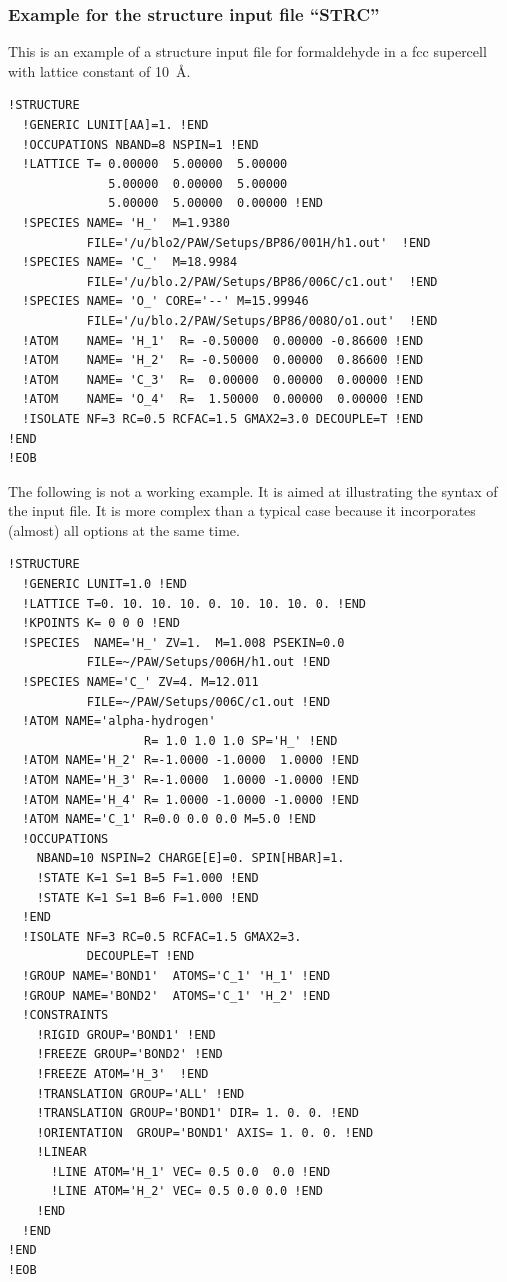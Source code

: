 \documentclass[final,12pt,makeidx,DIV=calc]{article}
\begin{document}
\subsubsection{Example for the structure input file ``STRC''}
This is an example of a structure input file for formaldehyde in a fcc
supercell with lattice constant of 10~\AA.
\begin{verbatim}
!STRUCTURE
  !GENERIC LUNIT[AA]=1. !END   
  !OCCUPATIONS NBAND=8 NSPIN=1 !END
  !LATTICE T= 0.00000  5.00000  5.00000               
              5.00000  0.00000  5.00000               
              5.00000  5.00000  0.00000 !END
  !SPECIES NAME= 'H_'  M=1.9380 
           FILE='/u/blo2/PAW/Setups/BP86/001H/h1.out'  !END 
  !SPECIES NAME= 'C_'  M=18.9984 
           FILE='/u/blo.2/PAW/Setups/BP86/006C/c1.out'  !END 
  !SPECIES NAME= 'O_' CORE='--' M=15.99946 
           FILE='/u/blo.2/PAW/Setups/BP86/008O/o1.out'  !END 
  !ATOM    NAME= 'H_1'  R= -0.50000  0.00000 -0.86600 !END
  !ATOM    NAME= 'H_2'  R= -0.50000  0.00000  0.86600 !END
  !ATOM    NAME= 'C_3'  R=  0.00000  0.00000  0.00000 !END
  !ATOM    NAME= 'O_4'  R=  1.50000  0.00000  0.00000 !END
  !ISOLATE NF=3 RC=0.5 RCFAC=1.5 GMAX2=3.0 DECOUPLE=T !END 
!END 
!EOB 
\end{verbatim}
The following is not a working example. It is aimed at illustrating
the syntax of the input file. It is more complex than a typical case
because it incorporates (almost) all options at the same time.
\begin{verbatim}
!STRUCTURE 
  !GENERIC LUNIT=1.0 !END 
  !LATTICE T=0. 10. 10. 10. 0. 10. 10. 10. 0. !END 
  !KPOINTS K= 0 0 0 !END 
  !SPECIES  NAME='H_' ZV=1.  M=1.008 PSEKIN=0.0
           FILE=~/PAW/Setups/006H/h1.out !END 
  !SPECIES NAME='C_' ZV=4. M=12.011 
           FILE=~/PAW/Setups/006C/c1.out !END 
  !ATOM NAME='alpha-hydrogen' 
                   R= 1.0 1.0 1.0 SP='H_' !END 
  !ATOM NAME='H_2' R=-1.0000 -1.0000  1.0000 !END 
  !ATOM NAME='H_3' R=-1.0000  1.0000 -1.0000 !END 
  !ATOM NAME='H_4' R= 1.0000 -1.0000 -1.0000 !END 
  !ATOM NAME='C_1' R=0.0 0.0 0.0 M=5.0 !END
  !OCCUPATIONS 
    NBAND=10 NSPIN=2 CHARGE[E]=0. SPIN[HBAR]=1. 
    !STATE K=1 S=1 B=5 F=1.000 !END 
    !STATE K=1 S=1 B=6 F=1.000 !END 
  !END
  !ISOLATE NF=3 RC=0.5 RCFAC=1.5 GMAX2=3. 
           DECOUPLE=T !END 
  !GROUP NAME='BOND1'  ATOMS='C_1' 'H_1' !END 
  !GROUP NAME='BOND2'  ATOMS='C_1' 'H_2' !END 
  !CONSTRAINTS
    !RIGID GROUP='BOND1' !END 
    !FREEZE GROUP='BOND2' !END 
    !FREEZE ATOM='H_3'  !END 
    !TRANSLATION GROUP='ALL' !END
    !TRANSLATION GROUP='BOND1' DIR= 1. 0. 0. !END
    !ORIENTATION  GROUP='BOND1' AXIS= 1. 0. 0. !END
    !LINEAR 
      !LINE ATOM='H_1' VEC= 0.5 0.0  0.0 !END 
      !LINE ATOM='H_2' VEC= 0.5 0.0 0.0 !END 
    !END 
  !END
!END 
!EOB
\end{verbatim}
\end{document}
